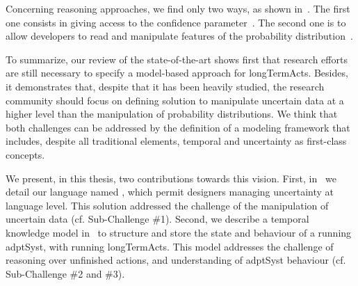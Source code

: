 Concerning reasoning approaches, we find only two ways, as shown in~.
The first one consists in giving access to the confidence parameter~\cite{DBLP:conf/models/BurguenoBMV18, DBLP:conf/ecmdafa/BertoaMBBTV18, DBLP:conf/sle/MayerhoferWV16, DBLP:conf/quatic/VallecilloMO16, DBLP:journals/tkde/BarbaraGP92, DBLP:conf/uist/SchwarzMH11}.
The second one is to allow developers to read and manipulate features of the probability distribution~\cite{baudin2017openturns, DBLP:conf/asplos/BornholtMM14, DBLP:journals/corr/BorgstromGGMG13, osti_1430202, DBLP:journals/peerj-cs/SalvatierWF16, DBLP:conf/popl/BhatAVG12, DBLP:conf/aistats/ChagantyNR13, DBLP:journals/siamsc/JaroszewiczK12, DBLP:journals/toplas/ParkPT08, DBLP:conf/ijcai/Pfeffer01, DBLP:conf/popl/RamseyP02, DBLP:conf/pldi/SankaranarayananCG13, DBLP:conf/icra/Thrun00, DBLP:journals/sac/LunnTBS00, plummer2003jags}.

To summarize, our review of the state-of-the-art shows first that research efforts are still necessary to specify a model-based approach for \glspl{longTermAct}.
Besides, it demonstrates that, despite that it has been heavily studied, the research community should focus on defining solution to manipulate uncertain data at a higher level than the manipulation of probability distributions.
We think that both challenges can be addressed by the definition of a modeling framework that includes, despite all traditional elements, temporal and uncertainty as first-class concepts.



We present, in this thesis, two contributions towards this vision.
First, in~ we detail our language named \langName{}, which permit designers managing uncertainty at language level.
This solution addressed the challenge of the manipulation of uncertain data (cf. Sub-Challenge \#1). 
Second, we describe a temporal knowledge model in~ to structure and store the state and behaviour of a running \gls{adptSyst}, with running \glspl{longTermAct}.
This model addresses the challenge of reasoning over unfinished actions, and understanding of \gls{adptSyst} \gls{behaviour} (cf. Sub-Challenge \#2 and \#3).





